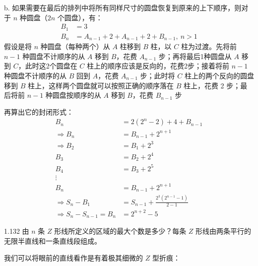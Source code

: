 b. 如果需要在最后的排列中将所有同样尺寸的圆盘恢复到原来的上下顺序，则对于 \( n \) 种圆盘（\( 2n \) 个圆盘），有：
\begin{align*}
  B_1 &= 3 \\
  B_n &= A_{n-1} + 2 + A_{n-1} + 2 + B_{n-1}, \ n>1
\end{align*}
假设是将 \( n \) 种圆盘（每种两个）从 \( A \) 柱移到 \( B \) 柱，以 \( C \) 柱为过渡。先将前 \( n-1 \) 种圆盘不计顺序的从 \( A \) 移到 \( B \)，花费 \( A_{n-1} \) 步；再将最后1种圆盘从 \( A \) 移到 \( C \)，此时这2个圆盘在 \( C \) 柱上的顺序应该是反向的，花费2步；接着将前 \( n-1 \) 种圆盘不计顺序的从 \( B \) 回到 \( A \)，花费 \( A_{n-1} \) 步；此时将 \( C \) 柱上的两个反向的圆盘移到 \( B \) 柱上，这样两个圆盘就可以按照正确的顺序落在 \( B \) 柱上，花费 2 步；最后将前 \( n-1 \) 种圆盘按顺序的从 \( A \) 移到 \( B \)，花费 \( B_{n-1} \) 步

再算出它的封闭形式：
\begin{align*}
  B_n & = 2 (2^n - 2) + 4 + B_{n-1} \\
  \Rightarrow B_n &= B_{n-1} + 2^{n+1} \\
  \Rightarrow B_2 &= B_1 + 2^3 \\
  B_3 &= B_2 + 2^4 \\
  B_4 &= B_3 + 2^5 \\
  \vdots
  \\ B_n &= B_{n-1} + 2^{n+1} \\
  \Rightarrow S_n - B_1 &= S_{n-1} + \frac{2^3(2^{n-1} - 1)}{2 - 1} \\
  \Rightarrow S_n - S_{n-1} = B_n &= 2^{n+2} - 5
\end{align*}

\begin{problem}{1.13}{2}
  由 \( n \) 条 \( Z \) 形线所定义的区域的最大个数是多少？每条 \( Z \) 形线由两条平行的无限半直线和一条直线段组成。
\end{problem}

我们可以将眼前的直线看作是有着极其细微的 \( Z \) 型折痕：

\begin{center}
\end{center}

